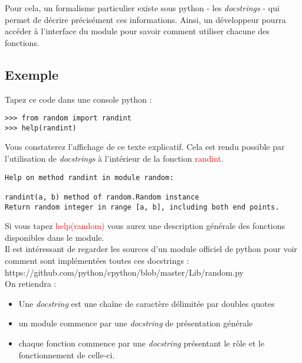 \documentclass[12pt,fleqn]{book} %
\begin{document}
Pour cela, un formalisme particulier existe sous python - les \textit{docstrings} - qui permet de décrire précisément ces informations. Ainsi, un développeur pourra accéder à l'interface du module pour savoir comment utiliser chacune des fonctions.

\subsection{Exemple}

Tapez ce code dans une console python : 

\begin{center}
	\begin{varwidth}[t]{.5\textwidth}
		\begin{lstlisting}[language=iPython,linewidth = 15cm]
>>> from random import randint
>>> help(randint)\end{lstlisting}
\end{varwidth}\end{center}

Vous constaterez l'affichage de ce texte explicatif. Cela est rendu possible par l'utilisation de \textit{docstrings} à l'intérieur de la fonction \textcolor{red}{randint}.

\begin{center}
	\begin{varwidth}[t]{.5\textwidth}
		\begin{lstlisting}[language=iPython,linewidth = 15cm]
Help on method randint in module random:

randint(a, b) method of random.Random instance
Return random integer in range [a, b], including both end points.\end{lstlisting}
\end{varwidth}\end{center}

Si vous tapez \textcolor{red}{help(random)} vous aurez une description générale des fonctions disponibles dans le module.\\

Il est intéressant de regarder les sources d'un module officiel de python pour voir comment sont implémentées toutes ces docstrings : https://github.com/python/cpython/blob/master/Lib/random.py \\
On retiendra : 
\begin{itemize}
	\item Une \textit{docstring} est une chaîne de caractère délimitée par doubles quotes
	\item un module commence par une \textit{docstring} de présentation générale
	\item chaque fonction commence par une \textit{docstring} présentant le rôle et le fonctionnement de celle-ci.
\end{itemize}
\end{document}

